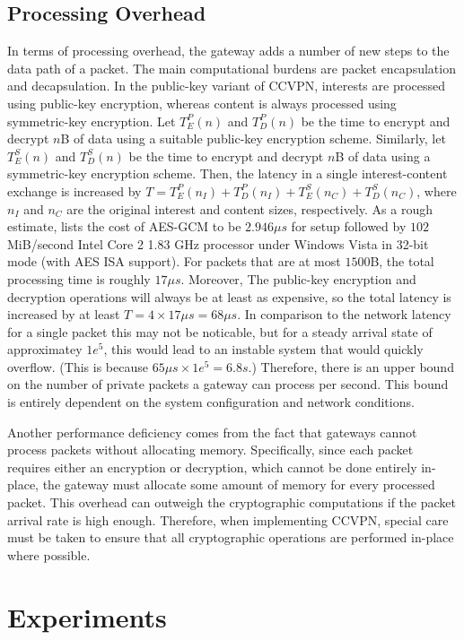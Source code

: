 \documentclass[conference,letterpaper,10pt]{IEEEtran}
\begin{document}
\subsection{Processing Overhead}
In terms of processing overhead, the gateway adds a number of new steps to the data
path of a packet. The main computational burdens are packet encapsulation and decapsulation.
In the public-key variant of CCVPN, interests are processed using public-key encryption, 
whereas content is always processed using symmetric-key encryption. Let $T_E^P(n)$ and $T_D^P(n)$
be the time to encrypt and decrypt $n$B of data using a suitable public-key encryption scheme.
Similarly, let $T_E^S(n)$ and $T_D^S(n)$ be the time to encrypt and decrypt $n$B of data
using a symmetric-key encryption scheme. Then, the latency in a single interest-content
exchange is increased by $T = T_E^P(n_I) + T_D^P(n_I) + T_E^S(n_C) + T_D^S(n_C)$, where
$n_I$ and $n_C$ are the original interest and content sizes, respectively. As a rough
estimate, \cite{benchmarks} lists the cost of AES-GCM to be $2.946\mu s$ for setup
followed by $102$MiB/second Intel Core 2 1.83 GHz processor under Windows Vista in 
32-bit mode (with AES ISA support). For packets that are at most $1500$B,
the total processing time is roughly $17\mu s$. Moreover, The public-key encryption and 
decryption operations will always be at least as expensive, so the total latency is 
increased by at least $T = 4 \times 17\mu s = 68 \mu s$. In comparison to the network
latency for a single packet this may not be noticable, but for a steady arrival state of
approximatey $1e^5$, this would lead to an instable system that would quickly overflow.
(This is because $65 \mu s \times 1e^5 = 6.8s$.) Therefore, there is an upper bound on
the number of private packets a gateway can process per second. This bound is entirely
dependent on the system configuration and network conditions.

Another performance deficiency comes from the fact that gateways cannot process packets
without allocating memory. Specifically, since each packet requires either an encryption
or decryption, which cannot be done entirely in-place, the gateway must allocate some amount
of memory for every processed packet. This overhead can outweigh the cryptographic computations
if the packet arrival rate is high enough. Therefore, when implementing CCVPN, special care
must be taken to ensure that all cryptographic operations are performed in-place where possible. 

\section{Experiments}
\end{document}
